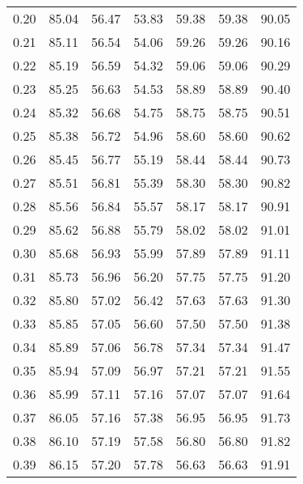 \begin{tabular}{|c|c|c|c|c|c|c|}
      0.20 &     85.04 &     56.47 &      53.83 &   59.38 &      59.38 &         90.05 \\
      0.21 &     85.11 &     56.54 &      54.06 &   59.26 &      59.26 &         90.16 \\
      0.22 &     85.19 &     56.59 &      54.32 &   59.06 &      59.06 &         90.29 \\
      0.23 &     85.25 &     56.63 &      54.53 &   58.89 &      58.89 &         90.40 \\
      0.24 &     85.32 &     56.68 &      54.75 &   58.75 &      58.75 &         90.51 \\
      0.25 &     85.38 &     56.72 &      54.96 &   58.60 &      58.60 &         90.62 \\
      0.26 &     85.45 &     56.77 &      55.19 &   58.44 &      58.44 &         90.73 \\
      0.27 &     85.51 &     56.81 &      55.39 &   58.30 &      58.30 &         90.82 \\
      0.28 &     85.56 &     56.84 &      55.57 &   58.17 &      58.17 &         90.91 \\
      0.29 &     85.62 &     56.88 &      55.79 &   58.02 &      58.02 &         91.01 \\
      0.30 &     85.68 &     56.93 &      55.99 &   57.89 &      57.89 &         91.11 \\
      0.31 &     85.73 &     56.96 &      56.20 &   57.75 &      57.75 &         91.20 \\
      0.32 &     85.80 &     57.02 &      56.42 &   57.63 &      57.63 &         91.30 \\
      0.33 &     85.85 &     57.05 &      56.60 &   57.50 &      57.50 &         91.38 \\
      0.34 &     85.89 &     57.06 &      56.78 &   57.34 &      57.34 &         91.47 \\
      0.35 &     85.94 &     57.09 &      56.97 &   57.21 &      57.21 &         91.55 \\
      0.36 &     85.99 &     57.11 &      57.16 &   57.07 &      57.07 &         91.64 \\
      0.37 &     86.05 &     57.16 &      57.38 &   56.95 &      56.95 &         91.73 \\
      0.38 &     86.10 &     57.19 &      57.58 &   56.80 &      56.80 &         91.82 \\
      0.39 &     86.15 &     57.20 &      57.78 &   56.63 &      56.63 &         91.91 \\

\end{tabular}

